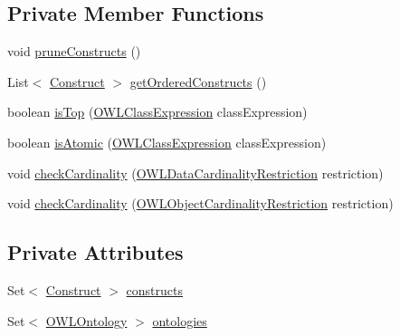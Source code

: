 \subsection*{Private Member Functions}
\begin{DoxyCompactItemize}
\item 
void \hyperlink{classorg_1_1semanticweb_1_1owlapi_1_1util_1_1_d_l_expressivity_checker_a6ec3b6f047bc5206bfed5c97b302dca2}{prune\-Constructs} ()
\item 
List$<$ \hyperlink{enumorg_1_1semanticweb_1_1owlapi_1_1util_1_1_d_l_expressivity_checker_1_1_construct}{Construct} $>$ \hyperlink{classorg_1_1semanticweb_1_1owlapi_1_1util_1_1_d_l_expressivity_checker_aef26a4d0f4706fde1753581c3b31963d}{get\-Ordered\-Constructs} ()
\item 
boolean \hyperlink{classorg_1_1semanticweb_1_1owlapi_1_1util_1_1_d_l_expressivity_checker_ae261b21bbf3fdf9f868dc850e60d44c7}{is\-Top} (\hyperlink{interfaceorg_1_1semanticweb_1_1owlapi_1_1model_1_1_o_w_l_class_expression}{O\-W\-L\-Class\-Expression} class\-Expression)
\item 
boolean \hyperlink{classorg_1_1semanticweb_1_1owlapi_1_1util_1_1_d_l_expressivity_checker_a6202597c4288347410cde8cc69a1accb}{is\-Atomic} (\hyperlink{interfaceorg_1_1semanticweb_1_1owlapi_1_1model_1_1_o_w_l_class_expression}{O\-W\-L\-Class\-Expression} class\-Expression)
\item 
void \hyperlink{classorg_1_1semanticweb_1_1owlapi_1_1util_1_1_d_l_expressivity_checker_a650427a427f5f4bb45de31c813b52ac7}{check\-Cardinality} (\hyperlink{interfaceorg_1_1semanticweb_1_1owlapi_1_1model_1_1_o_w_l_data_cardinality_restriction}{O\-W\-L\-Data\-Cardinality\-Restriction} restriction)
\item 
void \hyperlink{classorg_1_1semanticweb_1_1owlapi_1_1util_1_1_d_l_expressivity_checker_a92573fba21aad187569c2b7ce8f3f587}{check\-Cardinality} (\hyperlink{interfaceorg_1_1semanticweb_1_1owlapi_1_1model_1_1_o_w_l_object_cardinality_restriction}{O\-W\-L\-Object\-Cardinality\-Restriction} restriction)
\end{DoxyCompactItemize}
\subsection*{Private Attributes}
\begin{DoxyCompactItemize}
\item 
Set$<$ \hyperlink{enumorg_1_1semanticweb_1_1owlapi_1_1util_1_1_d_l_expressivity_checker_1_1_construct}{Construct} $>$ \hyperlink{classorg_1_1semanticweb_1_1owlapi_1_1util_1_1_d_l_expressivity_checker_a9c9585989f8385c0009afa34268200ec}{constructs}
\item 
Set$<$ \hyperlink{interfaceorg_1_1semanticweb_1_1owlapi_1_1model_1_1_o_w_l_ontology}{O\-W\-L\-Ontology} $>$ \hyperlink{classorg_1_1semanticweb_1_1owlapi_1_1util_1_1_d_l_expressivity_checker_affc39ee4929c0905abba809420579080}{ontologies}
\end{DoxyCompactItemize}


